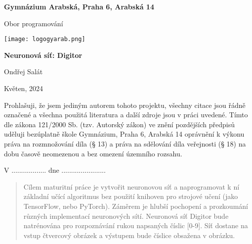 \begin{titlepage}
    \begin{center}
        \large \vspace*{\fill}
        \thispagestyle{empty}

        \LARGE

        { \huge \textbf{Gymnázium Arabská, Praha 6, Arabská 14}}

        {\LARGE Obor programování }

        \vfill
        \texttt{[image: logogyarab.png]}
        \vspace{15pt}

        \vfill

        {\huge \textbf{Neuronová síť: Digitor}}

        \vfill

        Ondřej Salát

        \vfill

        {\large Květen, 2024}

        \vspace*{\fill}
    \end{center}
\end{titlepage}

\thispagestyle{empty}
\addtocounter{page}{-1}
\vspace*{\fill}
Prohlašuji, že jsem jediným autorem tohoto projektu, všechny citace jsou řádně označené a všechna
použitá literatura a další zdroje jsou v práci uvedené. Tímto dle zákona 121/2000 Sb. (tzv. Autorský zákon)
ve znění pozdějších předpisů uděluji bezúplatně škole Gymnázium, Praha 6, Arabská 14 oprávnění k výkonu
práva na rozmnožování díla (§ 13) a práva na sdělování díla veřejnosti (§ 18) na dobu časově neomezenou a
bez omezení územního rozsahu.

\vspace{2cm}
V .................. dne .......................


\vspace{2cm}

\newpage
\begin{abstract}
    Cílem maturitní práce je vytvořit neuronovou síť a naprogramovat k ní základní učící algoritmus bez použití knihoven pro strojové učení (jako TensorFlow, nebo PyTorch).
    Záměrem je hlubší pochopení a prozkoumání různých implementací neuronových sítí. Neuronová síť Digitor bude natrénována pro rozpoznávání rukou napsaných číslic [0-9].
    Síť dostane na vstup čtvercový obrázek a výstupem bude číslice obsažena v obrázku.
\end{abstract}

\tableofcontents